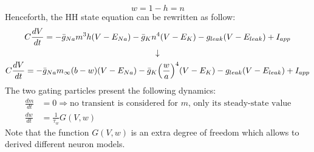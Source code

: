 \begin{equation*}
    w=1-h=n
\end{equation*}
Henceforth, the HH state equation can be rewritten as follow:
\begin{gather*}
    C\frac{dV}{dt}=-\bar{g}_{Na}m^{3}h(V-E_{Na})-\bar{g}_{K}n^{4}(V-E_{K})-g_{leak}(V-E_{leak})+I_{app}\\
    \downarrow\\
    C\frac{dV}{dt}=-\bar{g}_{Na}m_{\infty}(b-w)(V-E_{Na})-\bar{g}_{K}\Bigl(\frac{w}{a}\Bigr)^{4}(V-E_{K})-g_{leak}(V-E_{leak})+I_{app}
\end{gather*}
The two gating particles present the following dynamics:
\begin{align*}
    \frac{dm}{dt} & =0\Rightarrow{\text{no transient is considered for \(m\), only its steady-state value}} \\
    \frac{dw}{dt} & =\frac{1}{\tau_{w}}G(V,w)
\end{align*}
Note that the function \(G(V,w)\) is an extra degree of freedom which allows to derived different neuron models.

